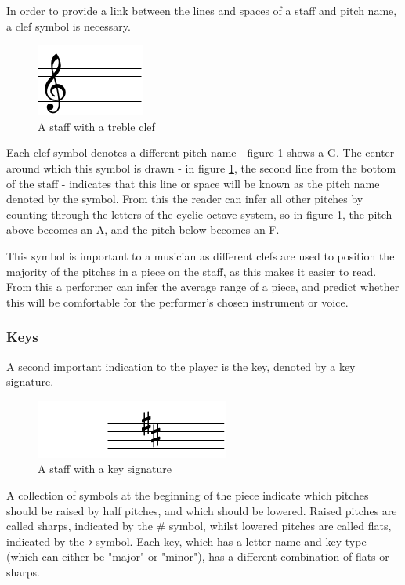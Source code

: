 In order to provide a link between the lines and spaces of a staff and pitch name, a clef symbol is necessary.
\begin{figure}[h]
    \centering
        \includegraphics{clef-crop.pdf}
    \caption{A staff with a treble clef}
    \label{fig:clef}
\end{figure}

Each clef symbol denotes a different pitch name - figure \ref{fig:clef} shows a G. The center around which this symbol is drawn - in figure \ref{fig:clef}, the second line from the bottom of the staff - indicates that this line or space will be known as the pitch name denoted by the symbol. From this the reader can infer all other pitches by counting through the letters of the cyclic octave system, so in figure \ref{fig:clef}, the pitch above becomes an A, and the pitch below becomes an F.

This symbol is important to a musician as different clefs are used to position the majority of the pitches in a piece on the staff, as this makes it easier to read. From this a performer can infer the average range of a piece, and predict whether this will be comfortable for the performer's chosen instrument or voice.

\subsubsection{Keys}
A second important indication to the player is the key, denoted by a key signature.
\begin{figure}[h]
    \centering
        \includegraphics{key-crop.pdf}
    \caption{A staff with a key signature}
    \label{fig:key}
\end{figure}

A collection of symbols at the beginning of the piece indicate which pitches should be raised by half pitches, and which should be lowered. Raised pitches are called sharps, indicated by the \# symbol, whilst lowered pitches are called flats, indicated by the $\flat$ symbol. Each key, which has a letter name and key type (which can either be "major" or "minor"), has a different combination of flats or sharps. 

